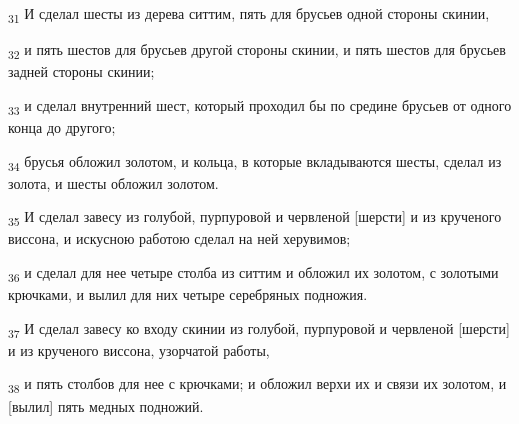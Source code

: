 \begin{tcolorbox}
\textsubscript{31} И сделал шесты из дерева ситтим, пять для брусьев одной стороны скинии,
\end{tcolorbox}
\begin{tcolorbox}
\textsubscript{32} и пять шестов для брусьев другой стороны скинии, и пять шестов для брусьев задней стороны скинии;
\end{tcolorbox}
\begin{tcolorbox}
\textsubscript{33} и сделал внутренний шест, который проходил бы по средине брусьев от одного конца до другого;
\end{tcolorbox}
\begin{tcolorbox}
\textsubscript{34} брусья обложил золотом, и кольца, в которые вкладываются шесты, сделал из золота, и шесты обложил золотом.
\end{tcolorbox}
\begin{tcolorbox}
\textsubscript{35} И сделал завесу из голубой, пурпуровой и червленой [шерсти] и из крученого виссона, и искусною работою сделал на ней херувимов;
\end{tcolorbox}
\begin{tcolorbox}
\textsubscript{36} и сделал для нее четыре столба из ситтим и обложил их золотом, с золотыми крючками, и вылил для них четыре серебряных подножия.
\end{tcolorbox}
\begin{tcolorbox}
\textsubscript{37} И сделал завесу ко входу скинии из голубой, пурпуровой и червленой [шерсти] и из крученого виссона, узорчатой работы,
\end{tcolorbox}
\begin{tcolorbox}
\textsubscript{38} и пять столбов для нее с крючками; и обложил верхи их и связи их золотом, и [вылил] пять медных подножий.
\end{tcolorbox}
